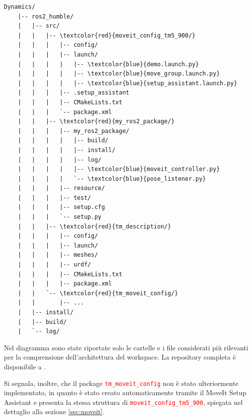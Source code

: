 \documentclass[11pt]{report}
\begin{document}
\begin{Verbatim}[commandchars=\\\{\}]
Dynamics/
    |-- ros2_humble/
    |   |-- src/
    |   |   |-- \textcolor{red}{moveit_config_tm5_900/}
    |   |   |   |-- config/
    |   |   |   |-- launch/
    |   |   |   |   |-- \textcolor{blue}{demo.launch.py}
    |   |   |   |   |-- \textcolor{blue}{move_group.launch.py}
    |   |   |   |   |-- \textcolor{blue}{setup_assistant.launch.py}
    |   |   |   |-- .setup_assistant
    |   |   |   |-- CMakeLists.txt
    |   |   |   `-- package.xml
    |   |   |-- \textcolor{red}{my_ros2_package/}
    |   |   |   |-- my_ros2_package/
    |   |   |   |   |-- build/
    |   |   |   |   |-- install/ 
    |   |   |   |   |-- log/
    |   |   |   |   |-- \textcolor{blue}{moveit_controller.py}
    |   |   |   |   `-- \textcolor{blue}{pose_listener.py}  
    |   |   |   |-- resource/
    |   |   |   |-- test/
    |   |   |   |-- setup.cfg
    |   |   |   `-- setup.py
    |   |   |-- \textcolor{red}{tm_description/}
    |   |   |   |-- config/
    |   |   |   |-- launch/  
    |   |   |   |-- meshes/
    |   |   |   |-- urdf/
    |   |   |   |-- CMakeLists.txt
    |   |   |   |-- package.xml
    |   |   `-- \textcolor{red}{tm_moveit_config/}
    |   |       |-- ...
    |   |-- install/
    |   |-- build/
    |   `-- log/
\end{Verbatim}

\newpage

Nel diagramma sono state riportate solo le cartelle e i file considerati più rilevanti per la comprensione dell'architettura del workspace. La repository completa è disponibile a \cite{Repository_ROS2}.

Si segnala, inoltre, che il package \textcolor{red}{\texttt{tm\_moveit\_config}} non è stato ulteriormente implementato, in quanto è stato creato automaticamente tramite il MoveIt Setup Assistant e presenta la stessa struttura di \textcolor{red}{\texttt{moveit\_config\_tm5\_900}}, spiegata nel dettaglio alla sezione \ref{sec:moveit}.
\end{document}
